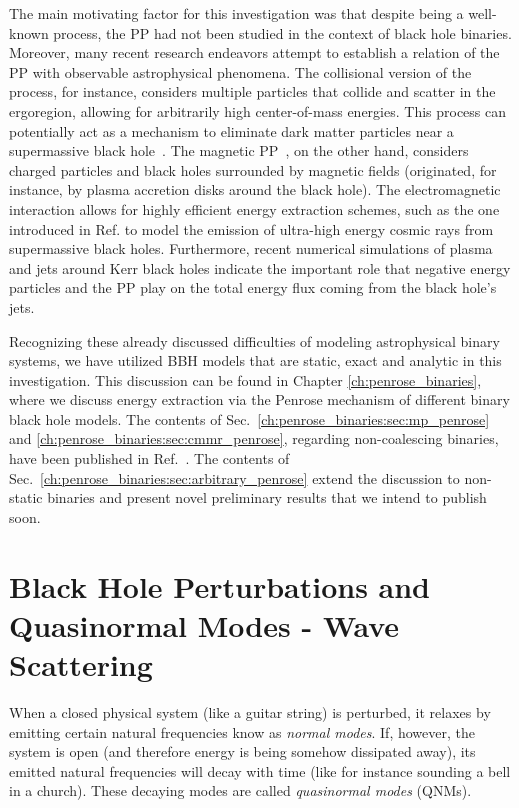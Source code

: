 The main motivating factor for this investigation was that despite being a well-known process, the \ac{PP} had not been studied in the context of black hole binaries. Moreover, many recent research endeavors attempt to establish a relation of the \ac{PP} with observable astrophysical phenomena.
The collisional version of the process, for instance, considers multiple particles that collide and scatter in the ergoregion, allowing for arbitrarily high center-of-mass energies. This process can potentially act as a mechanism to eliminate dark matter particles near a supermassive black hole~\cite{Schnittman:2018ccg}.
The magnetic \ac{PP}~\cite{Wagh1985,Tursunov:2019oiq}, on the other hand, considers charged particles and black holes surrounded by magnetic fields (originated, for instance, by plasma accretion disks around the black hole). The electromagnetic interaction allows for highly efficient energy extraction schemes, such as the one introduced in Ref.\cite{Tursunov:2020juz} to model the emission of ultra-high energy cosmic rays from supermassive black holes. Furthermore, recent numerical simulations of plasma and jets around Kerr black holes indicate the important role that negative energy particles and the \ac{PP} play on the total energy flux coming from the black hole's jets\cite{Parfrey:2018dnc}.

Recognizing these already discussed difficulties of modeling astrophysical binary systems, we have utilized \ac{BBH} models that are static, exact and analytic in this investigation.
This discussion can be found in Chapter \ref{ch:penrose_binaries}, where we discuss energy extraction via the Penrose mechanism of different binary black hole models. The contents of Sec.~\ref{ch:penrose_binaries:sec:mp_penrose} and \ref{ch:penrose_binaries:sec:cmmr_penrose}, regarding non-coalescing binaries, have been published in Ref.~\cite{PhysRevD.104.124025}. The contents of Sec.~\ref{ch:penrose_binaries:sec:arbitrary_penrose} extend the discussion to non-static binaries and present novel preliminary results that we intend to publish soon.

\section{Black Hole Perturbations and Quasinormal Modes - Wave Scattering}

When a closed physical system (like a guitar string) is perturbed, it relaxes by emitting certain natural frequencies know as \emph{normal modes}. If, however, the system is open (and therefore energy is being somehow dissipated away), its emitted natural frequencies will decay with time (like for instance sounding a bell in a church). These decaying modes are called \emph{quasinormal modes} (\acp{QNM}).

